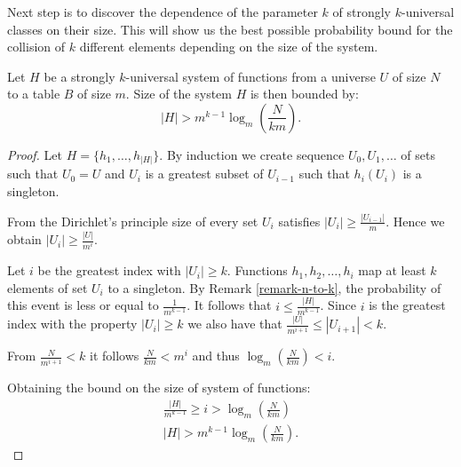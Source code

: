 Next step is to discover the dependence of the parameter $k$ of strongly $k$-universal classes on their size. This will show us the best possible probability bound for the collision of $k$ different elements depending on the size of the system.
\begin{theorem}
\label{theorem-strong-size}
Let $H$ be a strongly $k$-universal system of functions from a universe $U$ of size $N$ to a table $B$ of size $m$. Size of the system $H$ is then bounded by:
\begin{displaymath}
|H| > m^{k - 1} \log_m \left( \frac{N}{km} \right) \text{.}
\end{displaymath}
\end{theorem}
\begin{proof}
Let $H = \{h_1, \dots, h_{|H|}\}$. By induction we create sequence $U_0, U_1, \dots$ of sets such that $U_0 = U$ and $U_i$ is a greatest subset of $U_{i - 1}$ such that $h_i(U_i)$ is a singleton. 

From the Dirichlet's principle size of every set $U_i$ satisfies $|U_i| \geq \frac{|U_{i - 1}|}{m}$. Hence we obtain $|U_i| \geq \frac{|U|}{m^i}$.

Let $i$ be the greatest index with $|U_i| \geq k$. Functions $h_1, h_2,\dots, h_i$ map at least $k$ elements of set $U_i$ to a singleton. By Remark \ref{remark-n-to-k}, the probability of this event is less or equal to $\frac{1}{m ^ {k-1}}$. It follows that $i \leq \frac{|H|}{m ^ {k - 1}}$. Since $i$ is the greatest index with the property $|U_i| \geq k$ we also have that $\frac{|U|}{m ^ {i + 1}} \leq |U_{i + 1}| < k$. 

From $\frac{N}{m^{i + 1}} < k$ it follows $\frac{N}{km} < m ^ {i}$ and thus $\log_m \left( \frac{N}{km} \right) < i$.

Obtaining the bound on the size of system of functions:
\begin{gather*}
\frac{|H|}{m^{k - 1}} \geq i > \log_m \left( \frac{N}{km} \right) \\
|H| > m^{k - 1} \log_m \left( \frac{N}{km} \right) \text{.}
\end{gather*}
\end{proof}

